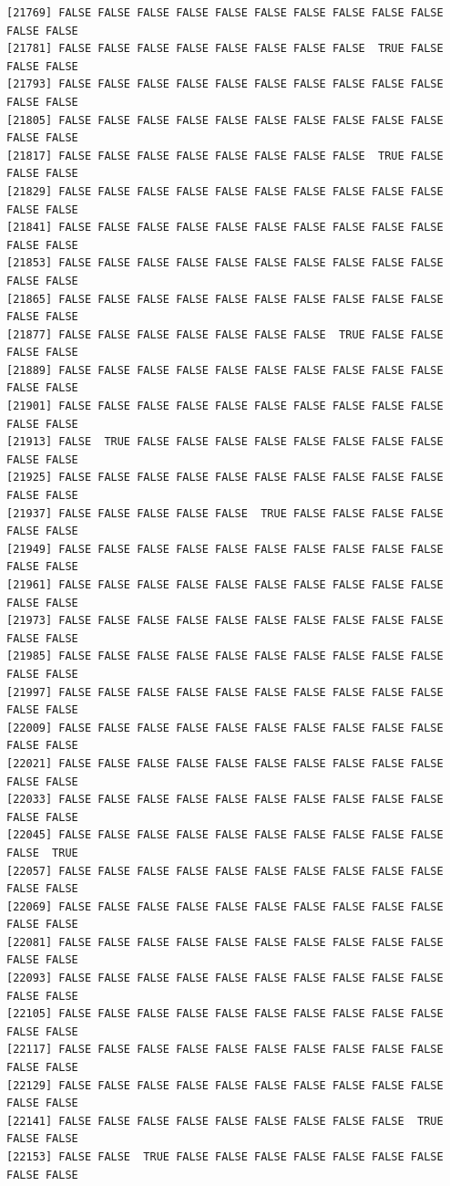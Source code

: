 \documentclass[
  a4paper,
  DIV=11,
  numbers=noendperiod]{scrartcl}
\begin{document}
\begin{verbatim}
[21769] FALSE FALSE FALSE FALSE FALSE FALSE FALSE FALSE FALSE FALSE FALSE FALSE
[21781] FALSE FALSE FALSE FALSE FALSE FALSE FALSE FALSE  TRUE FALSE FALSE FALSE
[21793] FALSE FALSE FALSE FALSE FALSE FALSE FALSE FALSE FALSE FALSE FALSE FALSE
[21805] FALSE FALSE FALSE FALSE FALSE FALSE FALSE FALSE FALSE FALSE FALSE FALSE
[21817] FALSE FALSE FALSE FALSE FALSE FALSE FALSE FALSE  TRUE FALSE FALSE FALSE
[21829] FALSE FALSE FALSE FALSE FALSE FALSE FALSE FALSE FALSE FALSE FALSE FALSE
[21841] FALSE FALSE FALSE FALSE FALSE FALSE FALSE FALSE FALSE FALSE FALSE FALSE
[21853] FALSE FALSE FALSE FALSE FALSE FALSE FALSE FALSE FALSE FALSE FALSE FALSE
[21865] FALSE FALSE FALSE FALSE FALSE FALSE FALSE FALSE FALSE FALSE FALSE FALSE
[21877] FALSE FALSE FALSE FALSE FALSE FALSE FALSE  TRUE FALSE FALSE FALSE FALSE
[21889] FALSE FALSE FALSE FALSE FALSE FALSE FALSE FALSE FALSE FALSE FALSE FALSE
[21901] FALSE FALSE FALSE FALSE FALSE FALSE FALSE FALSE FALSE FALSE FALSE FALSE
[21913] FALSE  TRUE FALSE FALSE FALSE FALSE FALSE FALSE FALSE FALSE FALSE FALSE
[21925] FALSE FALSE FALSE FALSE FALSE FALSE FALSE FALSE FALSE FALSE FALSE FALSE
[21937] FALSE FALSE FALSE FALSE FALSE  TRUE FALSE FALSE FALSE FALSE FALSE FALSE
[21949] FALSE FALSE FALSE FALSE FALSE FALSE FALSE FALSE FALSE FALSE FALSE FALSE
[21961] FALSE FALSE FALSE FALSE FALSE FALSE FALSE FALSE FALSE FALSE FALSE FALSE
[21973] FALSE FALSE FALSE FALSE FALSE FALSE FALSE FALSE FALSE FALSE FALSE FALSE
[21985] FALSE FALSE FALSE FALSE FALSE FALSE FALSE FALSE FALSE FALSE FALSE FALSE
[21997] FALSE FALSE FALSE FALSE FALSE FALSE FALSE FALSE FALSE FALSE FALSE FALSE
[22009] FALSE FALSE FALSE FALSE FALSE FALSE FALSE FALSE FALSE FALSE FALSE FALSE
[22021] FALSE FALSE FALSE FALSE FALSE FALSE FALSE FALSE FALSE FALSE FALSE FALSE
[22033] FALSE FALSE FALSE FALSE FALSE FALSE FALSE FALSE FALSE FALSE FALSE FALSE
[22045] FALSE FALSE FALSE FALSE FALSE FALSE FALSE FALSE FALSE FALSE FALSE  TRUE
[22057] FALSE FALSE FALSE FALSE FALSE FALSE FALSE FALSE FALSE FALSE FALSE FALSE
[22069] FALSE FALSE FALSE FALSE FALSE FALSE FALSE FALSE FALSE FALSE FALSE FALSE
[22081] FALSE FALSE FALSE FALSE FALSE FALSE FALSE FALSE FALSE FALSE FALSE FALSE
[22093] FALSE FALSE FALSE FALSE FALSE FALSE FALSE FALSE FALSE FALSE FALSE FALSE
[22105] FALSE FALSE FALSE FALSE FALSE FALSE FALSE FALSE FALSE FALSE FALSE FALSE
[22117] FALSE FALSE FALSE FALSE FALSE FALSE FALSE FALSE FALSE FALSE FALSE FALSE
[22129] FALSE FALSE FALSE FALSE FALSE FALSE FALSE FALSE FALSE FALSE FALSE FALSE
[22141] FALSE FALSE FALSE FALSE FALSE FALSE FALSE FALSE FALSE  TRUE FALSE FALSE
[22153] FALSE FALSE  TRUE FALSE FALSE FALSE FALSE FALSE FALSE FALSE FALSE FALSE

\end{verbatim}
\end{document}
